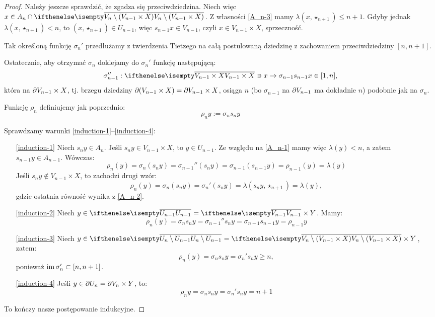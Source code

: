 \begin{thm}
\begin{proof}
  Należy jeszcze sprawdzić, że zgadza się przeciwdziedzina. Niech więc $x \in A_n \cap \cl{V_n\setminus(V_{n-1}\times X)}$. Z własności \ref{A_n-3} mamy $\lambda(x,\star_{n+1}) \leq n+1$. Gdyby jednak $\lambda(x,\star_{n+1}) < n$, to $(x,\star_{n+1})\in U_{n-1}$, więc $s_{n-1} x\in V_{n-1}$, czyli $x\in V_{n-1}\times X$, sprzeczność.
  
  Tak określoną funkcję $\sigma_n'$ przedłużamy z twierdzenia Tietzego na całą postulowaną dziedzinę z zachowaniem przeciwdziedziny $[n,n+1]$.
  
  Ostatecznie, aby otrzymać $\sigma_n$ doklejamy do $\sigma_n'$ funkcję następującą:
  \[
    \sigma_{n-1}'': \cl{V_{n-1}\times X}\ni x \to \sigma_{n-1}s_{n-1}x \in [1,n],
  \]
  która na $\partial{V_{n-1}}\times X$, tj. brzegu dziedziny $\partial({V_{n-1}\times X}) = \partial{V_{n-1}}\times X$, osiąga $n$ (bo $\sigma_{n-1}$ na $\partial{V_{n-1}}$ ma dokładnie $n$) podobnie jak na $\sigma_n$.
  
  Funkcję $\rho_n$ definiujemy jak poprzednio:
  \[
    \rho_n y := \sigma_n s_n y
  \]
  
  Sprawdzamy warunki \ref{induction-1}--\ref{induction-4}:
  \begin{enumerate}
    \item[\ref{induction-1}] Niech $s_n y \in A_n$. Jeśli $s_n y\in V_{n-1}\times X$, to $y\in U_{n-1}$. Ze względu na \ref{A_n-1} mamy więc $\lambda(y) < n$, a zatem $s_{n-1}y \in A_{n-1}$. Wówczas:
    \[
      \rho_n(y) = \sigma_n(s_n y) = \sigma_{n-1}''(s_n y) = \sigma_{n-1}(s_{n-1}y) = \rho_{n-1}(y) = \lambda(y)
    \]
    Jeśli $s_n y\not\in V_{n-1}\times X$, to zachodzi drugi wzór:
    \[
      \rho_n(y) = \sigma_n(s_n y) = \sigma_n'(s_n y) = \lambda(s_n y, \star_{n+1}) = \lambda(y),
    \]
    gdzie ostatnia równość wynika z \ref{A_n-2}.
   \item[\ref{induction-2}] Niech $y\in\cl{U_{n-1}} = \cl{V_{n-1}}\times Y$. Mamy:
   \[
     \rho_n(y) = \sigma_n s_n y = \sigma_{n-1}'' s_n y = \sigma_{n-1} s_{n-1} y = \rho_{n-1} y
   \]
   \item[\ref{induction-3}] Niech $y \in \cl{U_n \setminus U_{n-1}} = \cl{V_n \setminus (V_{n-1}\times X)}\times Y$, zatem:
   \[
     \rho_n(y) = \sigma_n s_n y = \sigma_n' s_n y \geq n,
   \]
   ponieważ $\operatorname{im} \sigma_n' \subset [n,n+1]$.
   \item[\ref{induction-4}] Jeśli $y\in\partial U_n = \partial V_n \times Y$, to:
   \[
     \rho_n y = \sigma_n s_n y = \sigma_n' s_n y = n+1
   \]
  \end{enumerate}
  To kończy nasze postępowanie indukcyjne.


\end{proof}
\end{thm}

